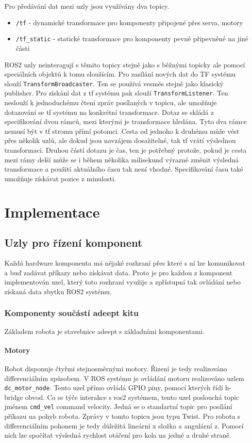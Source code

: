 Pro předávání dat mezi uzly jsou využívány dva topicy.
\begin{itemize}
	\item {\verb|/tf| - dynamické transformace pro komponenty připojené přes serva, motory}
	\item {\verb|/tf_static| - statické transformace pro komponenty pevně připevněné na jiné části}
\end{itemize} 
ROS2 uzly neinteragují s těmito topicy stejně jako s běžnými topicky ale pomocí speciálních objektů k tomu sloužícím. Pro zasílání nových dat do TF systému slouží \verb|TransformBroadcaster|. Ten se používá vesměs stejně jako klasický publisher.
Pro získání dat z tf systému pak slouží \verb|TransformListener|. Ten neslouží k jednoduchému čtení zpráv posílaných v topicu, ale umožňuje dotazování se tf systému na konkrétní transformace. Dotaz se skládá z specifikování dvou rámců, mezi kterými je transformace hledána. Tyto dva rámce nemusí být v tf stromu přímí potomci. Cesta od jednoho k druhému může vést přes několik uzlů, ale dokud jsou navzájem dosažitelné, tak tf vrátí výslednou transformaci. Druhou částí dotazu je čas, ten je potřebný protože, pokud je cesta mezi rámy delší může se i během několika milisekund výrazně změnit výsledná transformace a použití aktuálního času tak není vhodné. Specifikování času také umožňuje získávat pozice z minulosti. 

\chapter{Implementace}


\section{Uzly pro řízení komponent}
Každá hardware komponenta má nějaké rozhraní přes které s ní lze komunikovat a buď zadávat příkazy nebo získávat data. Proto je pro každou z komponent implementován uzel, který toto rozhraní využije a zpřístupní tak ovládání nebo získaná data zbytku ROS2 systému.

\subsection*{Komponenty součástí adeept kitu}
Základem robota je stavebnice adeept s základními komponentami.

\subsubsection*{Motory}
Robot disponuje čtyřmi stejnosměrnými motory. Řizení je tedy realizováno differenciálním způsobem. 
V ROS systému je ovládání motoru realizováno uzlem \verb|dc_motor_node|. Tento uzel přímo ovládá GPIO piny, pomocí kterých řídí h-bridge obvod. Co se týče interakce s ros2 systémem, tento uzel poslouchá topic jménem \verb|cmd_vel| command velocity. Jedná se o standartní topic pro posílání příkazu na pohyb robota. Zprávy v tomto topicu jsou typu Twist. Pro robota s differenciálním pohonem je tedy důležitá lineární x složka a angulární z. Pomocí nich lze spočítat výsledná rychlost otáčení pro kola na jedné a druhé straně.


